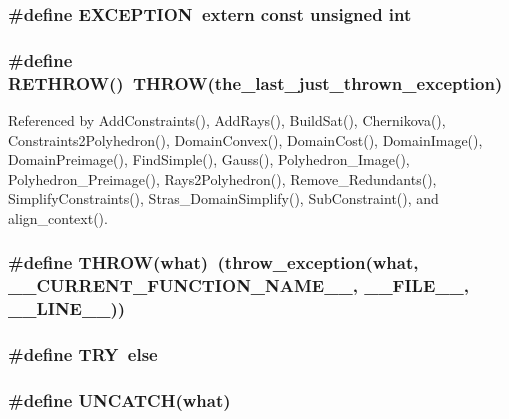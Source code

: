 \subsubsection{\setlength{\rightskip}{0pt plus 5cm}\#define EXCEPTION\ extern const unsigned int}\label{arithmetic__errors_8h_a2}


\subsubsection{\setlength{\rightskip}{0pt plus 5cm}\#define RETHROW()\ THROW(the\_\-last\_\-just\_\-thrown\_\-exception)}\label{arithmetic__errors_8h_a7}




Referenced by Add\-Constraints(), Add\-Rays(), Build\-Sat(), Chernikova(), Constraints2Polyhedron(), Domain\-Convex(), Domain\-Cost(), Domain\-Image(), Domain\-Preimage(), Find\-Simple(), Gauss(), Polyhedron\_\-Image(), Polyhedron\_\-Preimage(), Rays2Polyhedron(), Remove\_\-Redundants(), Simplify\-Constraints(), Stras\_\-Domain\-Simplify(), Sub\-Constraint(), and align\_\-context().

\subsubsection{\setlength{\rightskip}{0pt plus 5cm}\#define THROW(what)\ (throw\_\-exception(what, \_\-\_\-CURRENT\_\-FUNCTION\_\-NAME\_\-\_\-, \_\-\_\-FILE\_\-\_\-, \_\-\_\-LINE\_\-\_\-))}\label{arithmetic__errors_8h_a3}


\subsubsection{\setlength{\rightskip}{0pt plus 5cm}\#define TRY\ else}\label{arithmetic__errors_8h_a6}


\subsubsection{\setlength{\rightskip}{0pt plus 5cm}\#define UNCATCH(what)}\label{arithmetic__errors_8h_a5}


